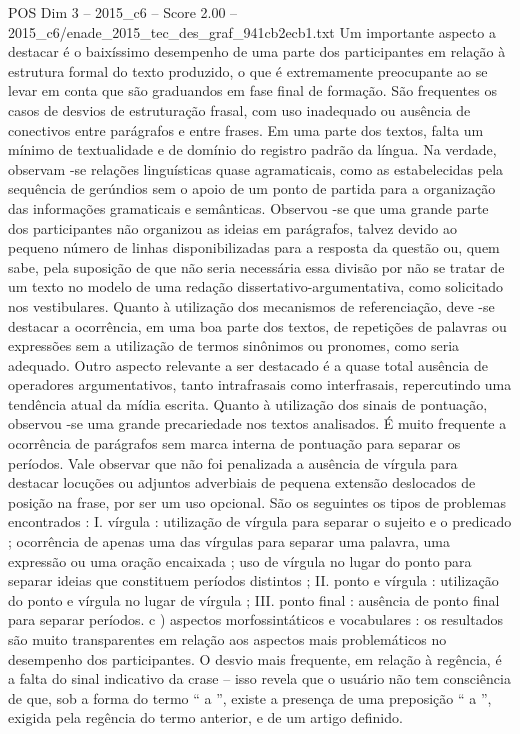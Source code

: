 \begin{textsample}{POS Dim 3 – 2015\_c6 – Score 2.00 – 2015\_c6/enade\_2015\_tec\_des\_graf\_941cb2ecb1.txt}
Um importante aspecto a destacar é o baixíssimo desempenho de uma parte dos participantes em relação à estrutura formal do texto produzido, o que é extremamente preocupante ao se levar em conta que são graduandos em fase final de formação.
São frequentes os casos de desvios de estruturação frasal, com uso inadequado ou ausência de conectivos entre parágrafos e entre frases.
Em uma parte dos textos, falta um mínimo de textualidade e de domínio do registro padrão da língua.
Na verdade, observam -se relações linguísticas quase agramaticais, como as estabelecidas pela sequência de gerúndios sem o apoio de um ponto de partida para a organização das informações gramaticais e semânticas.
Observou -se que uma grande parte dos participantes não organizou as ideias em parágrafos, talvez devido ao pequeno número de linhas disponibilizadas para a resposta da questão ou, quem sabe, pela suposição de que não seria necessária essa divisão por não se tratar de um texto no modelo de uma redação dissertativo-argumentativa, como solicitado nos vestibulares.
Quanto à utilização dos mecanismos de referenciação, deve -se destacar a ocorrência, em uma boa parte dos textos, de repetições de palavras ou expressões sem a utilização de termos sinônimos ou pronomes, como seria adequado.
Outro aspecto relevante a ser destacado é a quase total ausência de operadores argumentativos, tanto intrafrasais como interfrasais, repercutindo uma tendência atual da mídia escrita.
Quanto à utilização dos sinais de pontuação, observou -se uma grande precariedade nos textos analisados.
É muito frequente a ocorrência de parágrafos sem marca interna de pontuação para separar os períodos.
Vale observar que não foi penalizada a ausência de vírgula para destacar locuções ou adjuntos adverbiais de pequena extensão deslocados de posição na frase, por ser um uso opcional.
São os seguintes os tipos de problemas encontrados : I. vírgula : utilização de vírgula para separar o sujeito e o predicado ; ocorrência de apenas uma das vírgulas para separar uma palavra, uma expressão ou uma oração encaixada ; uso de vírgula no lugar do ponto para separar ideias que constituem períodos distintos ; II. ponto e vírgula : utilização do ponto e vírgula no lugar de vírgula ; III. ponto final : ausência de ponto final para separar períodos. c ) aspectos morfossintáticos e vocabulares : os resultados são muito transparentes em relação aos aspectos mais problemáticos no desempenho dos participantes.
O desvio mais frequente, em relação à regência, é a falta do sinal indicativo da crase – isso revela que o usuário não tem consciência de que, sob a forma do termo “ a ”, existe a presença de uma preposição “ a ”, exigida pela regência do termo anterior, e de um artigo definido.

\end{textsample}
